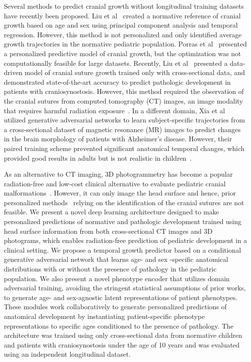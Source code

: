 \documentclass[conference]{IEEEtran}
\begin{document}
Several methods to predict cranial growth without longitudinal training datasets have recently been proposed. Liu et al~\cite{Liu2022Data-driven} created a normative reference of cranial growth based on age and sex using principal component analysis and temporal regression. However, this method is not personalized and only identified average growth trajectories in the normative pediatric population. Porras et al~\cite{Porras2022Predictive} presented a personalized predictive model of cranial growth, but the optimization was not computationally feasible for large datasets. Recently, Liu et al~\cite{Liu2023Data-driven} presented a data-driven model of cranial suture growth trained only with cross-sectional data, and demonstrated state-of-the-art accuracy to predict pathologic development in patients with craniosynostosis. However, this method required the observation of the cranial sutures from computed tomography (CT) images, an image modality that requires harmful radiation exposure~\cite{Schweitzer2012Avoiding}. In a different domain, Xia et al~\cite{Xia2021Learning} utilized generative adversarial networks to learn subject-specific trajectories from a cross-sectional dataset of magnetic resonance (MR) images to predict changes in the brain morphology of patients with Alzheimer’s disease. However, their paired training scheme prevented significant anatomical temporal changes, which provided good results in adults but is not realistic in children~\cite{Hasegawa2018Developmental}.

As an alternative to CT imaging, 3D photogrammetry has become a popular radiation-free and low-cost clinical alternative to evaluate pediatric cranial malformations~\cite{Porras2019Quantification, Abdel-Alim2021Three-Dimensional}. However, it can only image the head surface and hence, prior personalized  methods~\cite{Liu2023Data-driven} relying on the identification of the cranial sutures are not feasible. We present a novel deep learning architecture designed to make personalized predictions of normative and pathologic development trained using head surface information from both cross-sectional CT images and 3D photograms, which enables radiation-free prediction of pediatric development in a clinical setting. We propose a temporal growth predictor based on a conditional generative adversarial network that learns age- and sex -specific anatomical distributions with or without the presence of pathology in the pediatric population. We also present a novel phenotype encoder that utilizes domain adversarial training, avoiding the stringent statistical assumptions of prior works, to generate age- and sex-agnostic latent representations of patient phenotypes. These modules work collaboratively to generate personalized predictions of anatomical development by instantiating patient-specific phenotype representations to specific ages conditioned to the presence of pathology. The architecture was trained using only cross-sectional data from normative children and patients with craniosynostosis under the age of 10 years and was evaluated using an independent longitudinal dataset.
\end{document}

